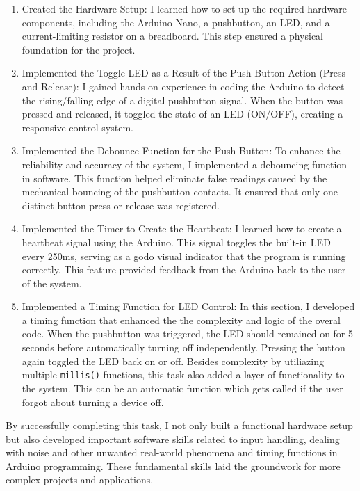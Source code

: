 \documentclass{scrartcl}                    %
\begin{document}
\begin{enumerate}
    \item Created the Hardware Setup: 
          I learned how to set up the required hardware components, including the Arduino Nano, a pushbutton, an LED, and a current-limiting resistor on a breadboard. This step ensured a physical foundation for the project.
    \item Implemented the Toggle LED as a Result of the Push Button Action (Press and Release):
          I gained hands-on experience in coding the Arduino to detect the rising/falling edge of a digital pushbutton signal. When the button was pressed and released, it toggled the state of an LED (ON/OFF), creating a responsive control system.
    \item Implemented the Debounce Function for the Push Button:
          To enhance the reliability and accuracy of the system, I implemented a debouncing function in software. This function helped eliminate false readings caused by the mechanical bouncing of the pushbutton contacts. It ensured that only one distinct button press or release was registered.
    \item Implemented the Timer to Create the Heartbeat:
          I learned how to create a heartbeat signal using the Arduino. This signal toggles the built-in LED every 250ms, serving as a godo visual indicator that the program is running correctly. This feature provided feedback from the Arduino back to the user of the system.
    \item Implemented a Timing Function for LED Control:
          In this section, I developed a timing function that enhanced the the complexity and logic of the overal code. When the pushbutton was triggered, the LED should remained on for 5 seconds before automatically turning off independently. Pressing the button again toggled the LED back on or off. Besides complexity by utiliazing multiple \texttt{millis()} functions, this task also added a layer of functionality to the system. This can be an automatic function which gets called if the user forgot about turning a device off.
\end{enumerate}
By successfully completing this task, I not only built a functional hardware setup but also developed important software skills related to input handling, dealing with noise and other unwanted real-world phenomena and timing functions in Arduino programming. These fundamental skills laid the groundwork for more complex projects and applications.

\newpage
\printbibliography
\end{document}
